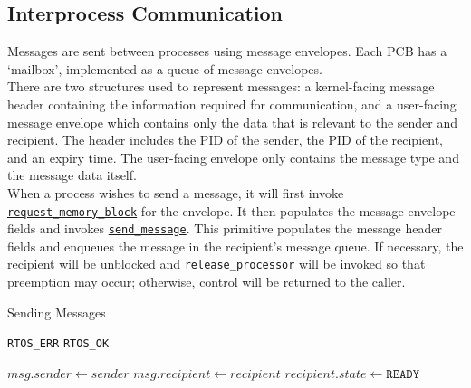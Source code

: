\documentclass[12pt]{report}
\begin{document}
\subsection{Interprocess Communication}

Messages are sent between processes using message envelopes. Each PCB has a `mailbox', implemented as a queue of message envelopes.\\

There are two structures used to represent messages: a kernel-facing message header containing the information required for communication, and a user-facing message envelope which contains only the data that is relevant to the sender and recipient. The header includes the PID of the sender, the PID of the recipient, and an expiry time. The user-facing envelope only contains the message type and the message data itself.\\

When a process wishes to send a message, it will first invoke \hyperref[alg:requestingmemoryblocks]{\texttt{request_memory_block}} for the envelope. It then populates the message envelope fields and invokes \hyperref[alg:sendingmessages]{\texttt{send_message}}. This primitive populates the message header fields and enqueues the message in the recipient's message queue. If necessary, the recipient will be unblocked and \hyperref[alg:releasingtheprocessor]{\texttt{release_processor}} will be invoked so that preemption may occur; otherwise, control will be returned to the caller.\\

\begin{algorithm}
\caption{Sending Messages}
\label{alg:sendingmessages}
\begin{algorithmic}[1]
        \State \Return \texttt{RTOS_ERR}
    \EndIf
            \State \Return {}
        \EndIf
    \EndIf
    \State \Return \texttt{RTOS_OK}
\EndProcedure

\Statex

    \State $msg.sender \leftarrow sender$
    \State $msg.recipient \leftarrow recipient$
    \State {}
        \State {}
        \State $recipient.state \leftarrow \texttt{READY}$
        \State {}
        \State {} 
    \Else
        \State {}
    \EndIf
\EndProcedure
\end{algorithmic}
\end{algorithm}
\end{document}
